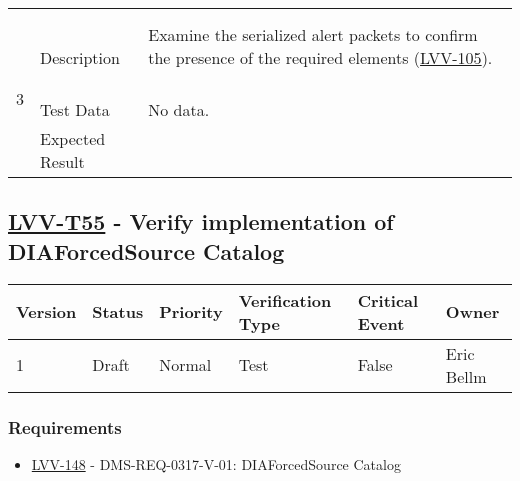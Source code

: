 \begin{longtable}[]{p{1.3cm}p{2cm}p{13cm}}
\begin{minipage}[t]{13cm}
{                    \vspace{\dp0}
                    } \end{minipage}
                \\ \hdashline


        \\ \midrule

            \multirow{3}{*}{ 3 } & Description &
            \begin{minipage}[t]{13cm}{\footnotesize
            Examine the serialized alert packets to confirm the presence of the
required elements
(\href{https://jira.lsstcorp.org/browse/LVV-105}{LVV-105}).~ ~ ~ ~ ~ ~ ~
~ ~ ~ ~ ~ ~ ~ ~ ~ ~

            \vspace{\dp0}
            } \end{minipage} \\ \cline{2-3}
            & Test Data &
            \begin{minipage}[t]{13cm}{\footnotesize
                No data.
                \vspace{\dp0}
            } \end{minipage} \\ \cline{2-3}
            & Expected Result &
        \\ \midrule
    \end{longtable}

\subsection{\href{https://jira.lsstcorp.org/secure/Tests.jspa\#/testCase/LVV-T55}{LVV-T55}
    - Verify implementation of DIAForcedSource Catalog}\label{lvv-t55}

\begin{longtable}[]{llllll}
\toprule
Version & Status & Priority & Verification Type & Critical Event & Owner
\\\midrule
1 & Draft & Normal &
Test & False & Eric Bellm
\\\bottomrule
\end{longtable}

\subsubsection{Requirements}
\begin{itemize}
\item \href{https://jira.lsstcorp.org/browse/LVV-148}{LVV-148} - DMS-REQ-0317-V-01: DIAForcedSource Catalog
\end{itemize}

